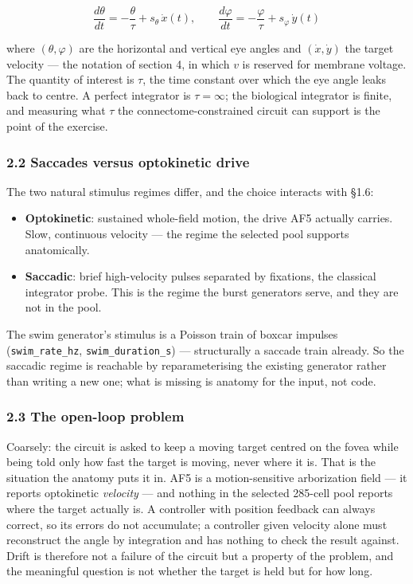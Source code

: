 \documentclass[10pt]{article}
\begin{document}
\begin{equation}
\label{eq:leaky-integral}
\frac{d\theta}{dt} = -\frac{\theta}{\tau} + s_\theta\,\dot x(t),
\qquad
\frac{d\varphi}{dt} = -\frac{\varphi}{\tau} + s_\varphi\,\dot y(t)
\end{equation}

where $(\theta,\varphi)$ are the horizontal and vertical eye angles and $(\dot x,\dot y)$
the target velocity --- the notation of section 4, in which $v$ is reserved for membrane
voltage. The quantity of interest is $\tau$, the time constant over which the eye angle
leaks back to centre. A perfect integrator is $\tau = \infty$; the biological integrator is
finite, and measuring what $\tau$ the connectome-constrained circuit can support is the
point of the exercise.

\subsubsection*{2.2 Saccades versus optokinetic drive}

The two natural stimulus regimes differ, and the choice interacts with \S{}1.6:

\begin{itemize}\setlength{\itemsep}{1pt}
\item \textbf{Optokinetic}: sustained whole-field motion, the drive AF5 actually carries.
Slow, continuous velocity --- the regime the selected pool supports anatomically.
\item \textbf{Saccadic}: brief high-velocity pulses separated by fixations, the classical
integrator probe. This is the regime the burst generators serve, and they are not in the
pool.
\end{itemize}

The swim generator's stimulus is a Poisson train of boxcar impulses
(\texttt{swim\_rate\_hz}, \texttt{swim\_duration\_s}) --- structurally a saccade train
already. So the saccadic regime is reachable by reparameterising the existing generator
rather than writing a new one; what is missing is anatomy for the input, not code.

\subsubsection*{2.3 The open-loop problem}

Coarsely: the circuit is asked to keep a moving target centred on the fovea while being told
only how fast the target is moving, never where it is. That is the situation the anatomy
puts it in. AF5 is a motion-sensitive arborization field --- it reports optokinetic
\emph{velocity} --- and nothing in the selected 285-cell pool reports where the target
actually is. A controller with position feedback can always correct, so its errors do not
accumulate; a controller given velocity alone must reconstruct the angle by integration and
has nothing to check the result against. Drift is therefore not a failure of the circuit but
a property of the problem, and the meaningful question is not whether the target is held but
for how long.
\end{document}
